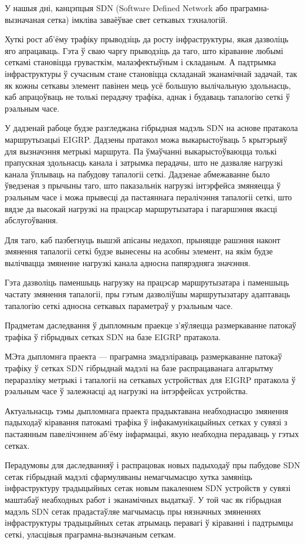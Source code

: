 \sectionWithoutNumber{\prefacename}

У нашыя дні, канцэпцыя SDN (Software Defined Network або праграмна-вызначаная сетка)
імкліва заваёўвае свет сеткавых тэхналогій.

Хуткі рост аб'ёму трафіку прыводзіць да росту інфраструктуры, якая
дазволіць яго апрацаваць. Гэта ў сваю чаргу прыводзіць да таго, што кіраванне
любымі сеткамі становіцца грувасткім, малаэфектыўным і складаным.
А падтрымка інфраструктуры ў сучасным стане становіцца складанай эканамічнай задачай,
так як кожны сеткавы элемент павінен мець усё большую вылічальную здольнасць, каб
апрацоўваць не толькі перадачу трафіка, аднак і будаваць тапалогію сеткі ў рэальным часе.

У дадзенай рабоце будзе разгледжана гібрыдная мадэль
SDN на аснове пратакола маршрутызацыі EIGRP.
Дадзены пратакол можа выкарыстоўваць 5 крытэрыяў для вызначэння метрыкі маршрута.
Па ўмаўчанні выкарыстоўваюцца толькі прапускная здольнасць канала і затрымка перадачы,
што не дазваляе нагрузкі канала ўплываць на пабудову тапалогіі сеткі.
Дадзенае абмежаванне было ўведзеная з прычыны таго, што паказальнік нагрузкі інтэрфейса
змяняецца ў рэальным часе і можа прывесці да пастаяннага пералічэння тапалогіі сеткі, што
вядзе да высокай нагрузкі на працэсар маршрутызатара і пагаршэння якасці абслугоўвання.

Для таго, каб пазбегнуць вышэй апісаны недахоп, прыняцце рашэння наконт змянення тапалогіі сеткі
будзе вынесены на асобны элемент, на якім будзе вылічвацца змяненне нагрузкі канала адносна
папярэдняга значэння.

Гэта дазволіць паменшыць нагрузку на працэсар маршрутызатара і паменшыць частату змянення
тапалогіі, пры гэтым дазволіўшы маршрутызатару адаптаваць тапалогію сеткі адносна сеткавых параметраў
у рэальным часе.

Прадметам даследвання ў дыпломным праекце з'яўляецца размеркаванне патокаў трафіка ў гібрыдных сетках SDN на базе EIGRP пратакола.

МЭта дыпломнга праекта --- праграмна змадэліраваць размеркаванне
патокаў трафіку ў сетках SDN гібрыднай мадэлі на базе распрацаванага алгарытму пераразліку метрыкі
і тапалогіі на сеткавых устройствах для EIGRP пратакола ў рэальным часе
ў залежнасці ад нагрузкі на інтэрфейсах устройства.

Актуальнасць тэмы дыпломнага праекта прадыктавана неабходнасцю
змянення падыходаў кіравання патокамі трафіка ў інфакамунікацыйных сетках
у сувязі з пастаянным павелічэннем аб'ёму інфармацыі, якую неабходна
перадаваць у гэтых сетках.

Перадумовы для даследванняў і распрацовак новых падыходаў пры пабудове
SDN сетак гібрыднай мадэлі сфармуляваны немагчымасцю хутка замяніць
інфраструктуру традыцыйных сетак новым пакаленнем SDN устройств у сувязі маштабаў неабходных
работ і эканамічных выдаткаў. У той час як гібрыдная мадэль SDN сетак
прадастаўляе магчымасць пры нязначных змяненнях інфраструктуры традыцыйных сетак атрымаць перавагі ў кіраванні і падтрымцы сеткі, уласцівыя праграмна-вызначаным сеткам.


\clearpage
